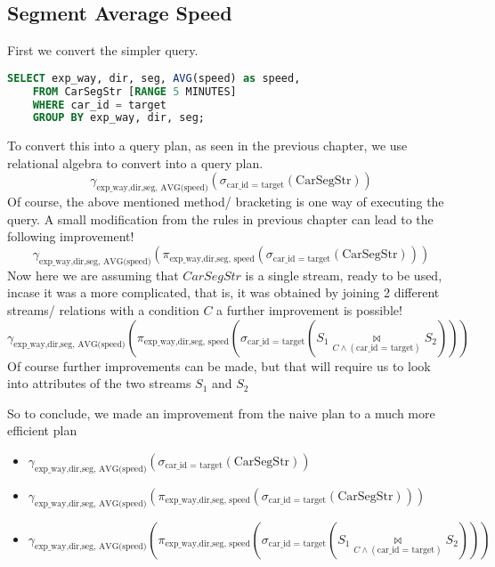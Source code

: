 \subsection{Segment Average Speed}
First we convert the simpler query.
\begin{lstlisting}[language=SQL]
    SELECT exp_way, dir, seg, AVG(speed) as speed,
    FROM CarSegStr [RANGE 5 MINUTES]
    WHERE car_id = target
    GROUP BY exp_way, dir, seg;
\end{lstlisting}
To convert this into a query plan, as seen in the previous chapter, we use relational algebra to convert into a query plan.
$$\gamma_{\text{exp\_way,dir,seg, AVG(speed)}}(\sigma_{\text{car\_id = target}}(\text{CarSegStr}))$$
Of course, the above mentioned method/ bracketing is one way of executing the query. A small modification from the rules in previous chapter can lead to the following improvement!
$$\gamma_{\text{exp\_way,dir,seg, AVG(speed)}}(\pi_{\text{exp\_way,dir,seg, speed}}(\sigma_{\text{car\_id = target}} (\text{CarSegStr})))$$
Now here we are assuming that $CarSegStr$ is a single stream, ready to be used, incase it was a more complicated, that is, it was obtained by joining 2 different streams/ relations with a condition $C$ a further improvement is possible!\\
$$\gamma_{\text{exp\_way,dir,seg, AVG(speed)}}(\pi_{\text{exp\_way,dir,seg, speed}}(\sigma_{\text{car\_id = target}} (S_1\underset{C \land (\text{car\_id = target})}{\bowtie}S_2)))$$
Of course further improvements can be made, but that will require us to look into attributes of the two streams $S_1$ and $S_2$
\par So to conclude, we made an improvement from the naive plan to a much more efficient plan
\begin{itemize}
    \item $\gamma_{\text{exp\_way,dir,seg, AVG(speed)}}(\sigma_{\text{car\_id = target}}(\text{CarSegStr}))$
    \item $\gamma_{\text{exp\_way,dir,seg, AVG(speed)}}(\pi_{\text{exp\_way,dir,seg, speed}}(\sigma_{\text{car\_id = target}} (\text{CarSegStr})))$
    \item $\gamma_{\text{exp\_way,dir,seg, AVG(speed)}}(\pi_{\text{exp\_way,dir,seg, speed}}(\sigma_{\text{car\_id = target}} (S_1\underset{C \land (\text{car\_id = target})}{\bowtie}S_2)))$
\end{itemize}

